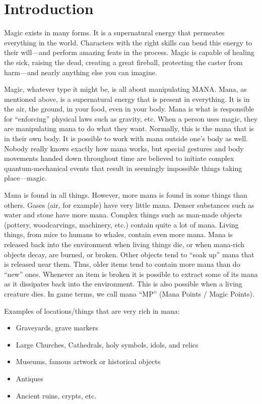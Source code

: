 \section{Introduction}

Magic exists in many forms.  It is a supernatural energy that
permeates everything in the world.  Characters with the right skills
can bend this energy to their will---and perform amazing feats in the
process.  Magic is capable of healing the sick, raising the dead,
creating a great fireball, protecting the caster from harm---and
nearly anything else you can imagine.

Magic, whatever type it might be, is all about manipulating MANA.
Mana, as mentioned above, is a supernatural energy that is present in
everything.  It is in the air, the ground, in your food, even in your
body.  Mana is what is responsible for ``enforcing'' physical laws
such as gravity, etc.  When a person uses magic, they are manipulating
mana to do what they want.  Normally, this is the mana that is in
their own body.  It is possible to work with mana outside one's body
as well.  Nobody really knows exactly how mana works, but special
gestures and body movements handed down throughout time are believed
to initiate complex quantum-mechanical events that result in seemingly
impossible things taking place---magic.

Mana is found in all things.  However, more mana is found in some
things than others.  Gases (air, for example) have very little mana.
Denser substances such as water and stone have more mana.  Complex
things such as man-made objects (pottery, woodcarvings, machinery,
etc.) contain quite a lot of mana.  Living things, from mice to humans
to whales, contain even more mana.  Mana is released back into the
environment when living things die, or when mana-rich objects decay,
are burned, or broken.  Other objects tend to ``soak up'' mana that is
released near them.  Thus, older items tend to contain more mana than
do ``new'' ones.  Whenever an item is broken it is possible to extract
some of its mana as it dissipates back into the environment.  This is
also possible when a living creature dies.  In game terms, we call
mana ``MP'' (Mana Points / Magic Points).

Examples of locations/things that are very rich in mana:
\begin{itemize}
\item Graveyards, grave markers
\item Large Churches, Cathedrals, holy symbols, idols, and relics
\item Museums, famous artwork or historical objects
\item Antiques
\item Ancient ruins, crypts, etc.
\end{itemize}

